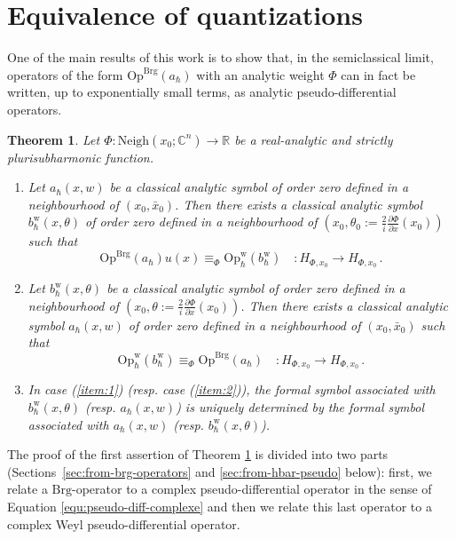 \documentclass{article}
\newtheorem{theo}{Theorem}[section]
\newcommand{\Vois}{\mathrm{Neigh}}
\newcommand{\Op}{\mathrm{Op}}
\newcommand{\Brg}{\mathrm{Brg}}
\newcommand{\w}{\mathrm{w}}
\newcommand{\CM}{\mathbb{C}}
\newcommand{\h}{\hbar}
\newcommand{\hnegl}{\equiv_\Phi}
\begin{document}
\section{Equivalence of quantizations}
\label{sec:proof}
One of the main results of this work is to show that, in the
semiclassical limit, operators of the form $ \Op^{\Brg}(a_{ \hbar})$
with an analytic weight $\Phi$ can in fact be written, up to
exponentially small terms, as analytic pseudo-differential operators.



\begin{theo} \label{theom} Let
  $ \Phi: \Vois(x_0; \CM^n) \to \mathbb{R}$ be a real-analytic and
  strictly plurisubharmonic function.
  \begin{enumerate}
  \item \label{item:1} Let $a_{ \hbar}(x, w)$ be a classical analytic
    symbol of order zero defined in a neighbourhood of
    $(x_0, \bar{x}_0)$. Then there exists a classical analytic symbol
    $b^{\w}_{ \hbar}(x, \theta)$ of order zero defined in a
    neighbourhood of
    $ \left( x_0, \theta_0:= \frac{2}{i} \frac{\partial \Phi}{\partial
        x}(x_0) \right)$ such that
    \[
    \Op^{\Brg}(a_{ \hbar}) u(x) \hnegl \Op^{\w}_\h(b^{\w}_{ \hbar})
    \quad : H_{ \Phi, x_0} \to H_{ \Phi, x_0}\,.
    \]
  \item \label{item:2} Let $b^{\w}_{ \hbar}(x, \theta)$ be a classical
    analytic symbol of order zero defined in a neighbourhood of
    $ \left( x_0, \theta := \frac{2}{i} \frac{\partial \Phi}{\partial
        x}(x_0) \right)$.
    Then there exists a classical analytic symbol $a_{ \hbar}(x, w)$
    of order zero defined in a neighbourhood of $(x_0, \bar{x}_0)$
    such that
    \[
    \Op^{\w}_\h(b^{\w}_{ \hbar}) \hnegl \Op^{\Brg}(a_{ \hbar}) \quad :
    H_{ \Phi, x_0} \to H_{ \Phi, x_0}\,.
    \]
  \item In case (\ref{item:1}) (resp. case (\ref{item:2})), the formal
    symbol associated with $b^{\w}_{ \hbar}(x, \theta)$ (resp.
    $a_{ \hbar}(x, w)$) is uniquely determined by the formal symbol
    associated with $a_{ \hbar}(x, w)$ (resp.
    $b^{\w}_{ \hbar}(x, \theta)$).
  \end{enumerate}
\end{theo}






The proof of the first assertion of Theorem \ref{theom} is divided
into two parts (Sections~\ref{sec:from-brg-operators} and
\ref{sec:from-hbar-pseudo} below): first, we relate a $\Brg$-operator
to a complex pseudo-differential operator in the sense of Equation
\eqref{equ:pseudo-diff-complexe} and then we relate this last operator
to a complex Weyl pseudo-differential operator.
\end{document}
